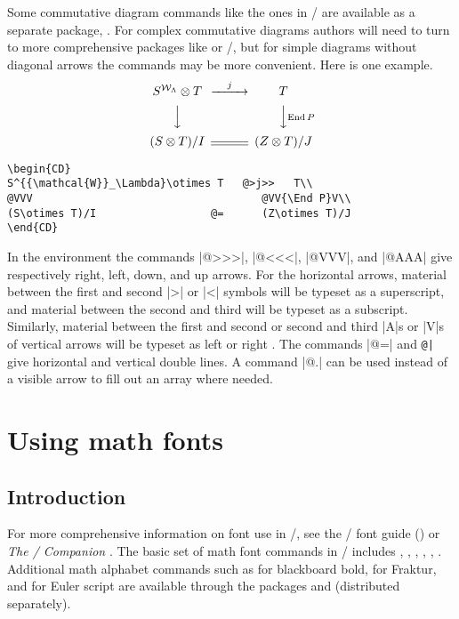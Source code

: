 \documentclass[leqno,titlepage,openany]{amsldoc}[1999/12/13]
\newcommand{\booktitle}[1]{\textit{#1}}
\DeclareMathOperator{\End}{End}
\begin{document}
Some commutative diagram commands like the ones in \amstex/ are
available as a separate package, . For complex commutative
diagrams authors will need to turn to more comprehensive packages like
 or \xypic/, but for simple diagrams without diagonal
arrows the  commands
may be more convenient. Here is one example.
\begin{equation*}
\begin{CD}
S^{{\mathcal{W}}_\Lambda}\otimes T   @>j>>   T\\
@VVV                                    @VV{\End P}V\\
(S\otimes T)/I                  @=      (Z\otimes T)/J
\end{CD}
\end{equation*}
\begin{verbatim}
\begin{CD}
S^{{\mathcal{W}}_\Lambda}\otimes T   @>j>>   T\\
@VVV                                    @VV{\End P}V\\
(S\otimes T)/I                  @=      (Z\otimes T)/J
\end{CD}
\end{verbatim}
In the  environment the commands |@>>>|,
|@<<<|, |@VVV|, and |@AAA| give respectively right, left, down, and up
arrows. For the horizontal arrows, material between the first and second
|>| or |<| symbols will be typeset as a superscript, and material
between the second and third will be typeset as a subscript. Similarly,
material between the first and second or second and third |A|s or |V|s
of vertical arrows will be typeset as left or right .
The commands |@=| and \verb'@|' give horizontal and vertical double lines.
A  command |@.| can be used instead of a visible arrow
to fill out an array where needed.

\chapter{Using math fonts}

\section{Introduction}

For more comprehensive information on font use in \latex/, see the
\latex/ font guide () or \booktitle{The \latex/
Companion} \cite{tlc}. The basic set of math font commands\relax {} in \latex/ includes
, , , , ,
. Additional math alphabet commands such as
 for blackboard bold,  for Fraktur, and
 for Euler script are available through the packages
 and  (distributed separately).
\end{document}

